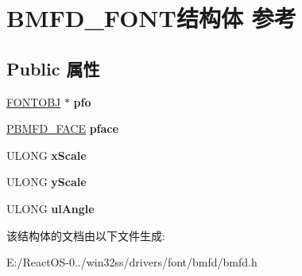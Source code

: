 \hypertarget{struct_b_m_f_d___f_o_n_t}{}\section{B\+M\+F\+D\+\_\+\+F\+O\+N\+T结构体 参考}
\label{struct_b_m_f_d___f_o_n_t}
\subsection*{Public 属性}
\begin{DoxyCompactItemize}
\item 
\mbox{\label{struct_b_m_f_d___f_o_n_t_a2e63f440be342bc3d8c1e30c3693bd9f}} 
\hyperlink{struct___f_o_n_t_o_b_j}{F\+O\+N\+T\+O\+BJ} $\ast$ {\bfseries pfo}
\item 
\mbox{\label{struct_b_m_f_d___f_o_n_t_ad204df38979672938ea31af728a521c7}} 
\hyperlink{struct_b_m_f_d___f_a_c_e}{P\+B\+M\+F\+D\+\_\+\+F\+A\+CE} {\bfseries pface}
\item 
\mbox{\label{struct_b_m_f_d___f_o_n_t_a6ec5f5d9dd95e9aa1af75e065b16c16e}} 
U\+L\+O\+NG {\bfseries x\+Scale}
\item 
\mbox{\label{struct_b_m_f_d___f_o_n_t_aa56c3b3b9d9f3b8ced06826aa1af5dfd}} 
U\+L\+O\+NG {\bfseries y\+Scale}
\item 
\mbox{\label{struct_b_m_f_d___f_o_n_t_a98e6bd9a2deb41446007603f0a888dbe}} 
U\+L\+O\+NG {\bfseries ul\+Angle}
\end{DoxyCompactItemize}


该结构体的文档由以下文件生成\+:\begin{DoxyCompactItemize}
\item 
E\+:/\+React\+O\+S-\/0../win32ss/drivers/font/bmfd/bmfd.\+h\end{DoxyCompactItemize}
